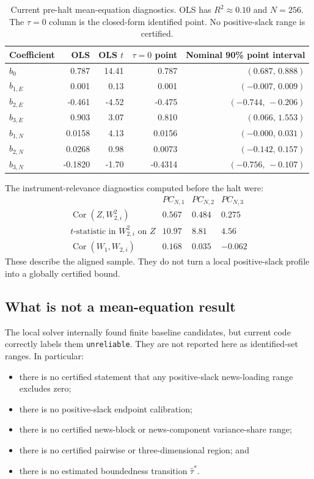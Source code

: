 \documentclass[11pt]{article}
\begin{document}
\begin{table}[ht]
\centering
\small
\begin{tabular}{lrrrr}
\toprule
Coefficient & OLS & OLS $t$ & $\tau=0$ point & Nominal 90\% point interval \\
\midrule
$b_0$       & 0.787 & 14.41 & 0.787  & $(0.687,\,0.888)$ \\
$b_{1,E}$   & 0.001 & 0.13  & 0.001  & $(-0.007,\,0.009)$ \\
$b_{2,E}$   & -0.461 & -4.52 & -0.475 & $(-0.744,\,-0.206)$ \\
$b_{3,E}$   & 0.903 & 3.07  & 0.810  & $(0.066,\,1.553)$ \\
\midrule
$b_{1,N}$   & 0.0158 & 4.13  & 0.0156 & $(-0.000,\,0.031)$ \\
$b_{2,N}$   & 0.0268 & 0.98  & 0.0073 & $(-0.142,\,0.157)$ \\
$b_{3,N}$   & -0.1820 & -1.70 & -0.4314 & $(-0.756,\,-0.107)$ \\
\bottomrule
\end{tabular}
\caption{Current pre-halt mean-equation diagnostics. OLS has $R^2\approx0.10$
and $N=256$. The $\tau=0$ column is the closed-form identified point. No
positive-slack range is certified.}
\label{tab:mean-current}
\end{table}

The instrument-relevance diagnostics computed before the halt were:
\[
\begin{array}{c|ccc}
 & PC_{N,1} & PC_{N,2} & PC_{N,3}\\
\hline
\operatorname{Cor}(Z,W_{2,i}^2) & 0.567 & 0.484 & 0.275\\
t\text{-statistic in }W_{2,i}^2\text{ on }Z & 10.97 & 8.81 & 4.56\\
\operatorname{Cor}(W_1,W_{2,i}) & 0.168 & 0.035 & -0.062
\end{array}
\]
These describe the aligned sample. They do not turn a local positive-slack
profile into a globally certified bound.

\subsection{What is not a mean-equation result}

The local solver internally found finite baseline candidates, but current code
correctly labels them \texttt{unreliable}. They are not reported here as
identified-set ranges. In particular:

\begin{itemize}[leftmargin=1.5em]
  \item there is no certified statement that any positive-slack news-loading
    range excludes zero;
  \item there is no positive-slack endpoint calibration;
  \item there is no certified news-block or news-component variance-share
    range;
  \item there is no certified pairwise or three-dimensional region; and
  \item there is no estimated boundedness transition $\widehat\tau^\ast$.
\end{itemize}
\end{document}
